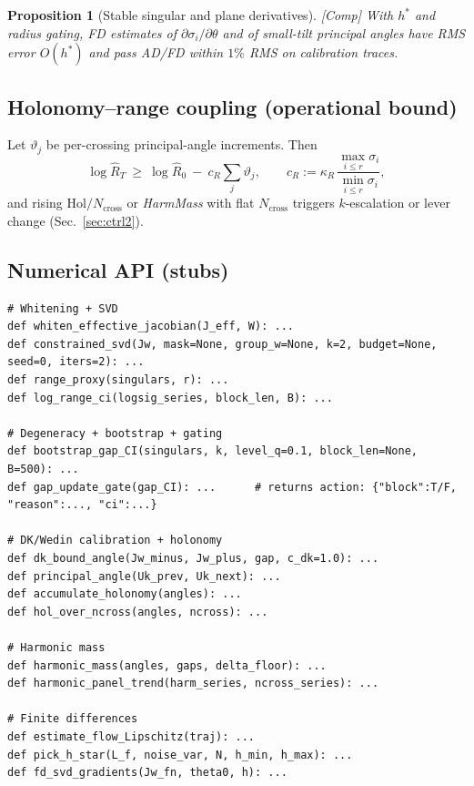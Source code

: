 \documentclass[10pt]{article}
\newcommand{\layertag}[1]{\textup{[#1]}}
\newtheorem{proposition}{Proposition}
\begin{document}
\begin{proposition}[Stable singular and plane derivatives]\label{prop:svdgrads}
\emph{\layertag{Comp}}
With $h^\ast$ and radius gating, FD estimates of $\partial \sigma_i/\partial \theta$ and of small-tilt principal angles have RMS error $O(h^\ast)$ and pass AD/FD within $1\%$ RMS on calibration traces.
\end{proposition}

\subsection*{Holonomy–range coupling (operational bound)}
Let $\vartheta_j$ be per-crossing principal-angle increments. Then
\[
\log \widehat R_T \ \ge\ \log \widehat R_0 \ -\ c_R \sum_j \vartheta_j,
\qquad
c_R:=\kappa_R\,\frac{\max_{i\le r}\sigma_i}{\min_{i\le r}\sigma_i},
\]
and rising $\mathrm{Hol}/N_{\mathrm{cross}}$ or \emph{HarmMass} with flat $N_{\mathrm{cross}}$ triggers $k$-escalation or lever change (Sec.~\ref{sec:ctrl2}).

\subsection*{Numerical API (stubs)}
\begin{lstlisting}
# Whitening + SVD
def whiten_effective_jacobian(J_eff, W): ...
def constrained_svd(Jw, mask=None, group_w=None, k=2, budget=None, seed=0, iters=2): ...
def range_proxy(singulars, r): ...
def log_range_ci(logsig_series, block_len, B): ...

# Degeneracy + bootstrap + gating
def bootstrap_gap_CI(singulars, k, level_q=0.1, block_len=None, B=500): ...
def gap_update_gate(gap_CI): ...      # returns action: {"block":T/F, "reason":..., "ci":...}

# DK/Wedin calibration + holonomy
def dk_bound_angle(Jw_minus, Jw_plus, gap, c_dk=1.0): ...
def principal_angle(Uk_prev, Uk_next): ...
def accumulate_holonomy(angles): ...
def hol_over_ncross(angles, ncross): ...

# Harmonic mass
def harmonic_mass(angles, gaps, delta_floor): ...
def harmonic_panel_trend(harm_series, ncross_series): ...

# Finite differences
def estimate_flow_Lipschitz(traj): ...
def pick_h_star(L_f, noise_var, N, h_min, h_max): ...
def fd_svd_gradients(Jw_fn, theta0, h): ...
\end{lstlisting}
\end{document}
